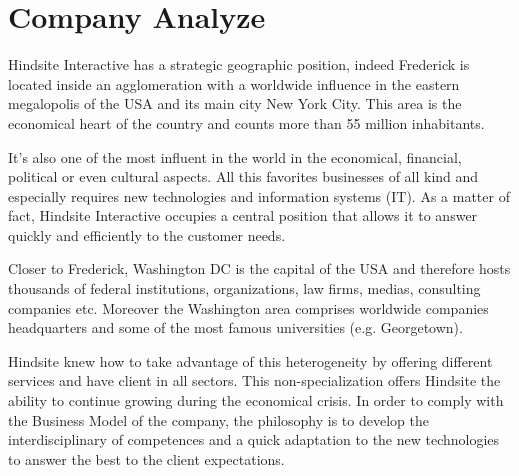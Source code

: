 \section{Company Analyze}

Hindsite Interactive has a strategic geographic position, indeed Frederick is
located inside an agglomeration with a worldwide influence in the eastern
megalopolis of the USA and its main city New York City. This area is the
economical heart of the country and counts more than 55 million inhabitants.

It’s also one of the most influent in the world in the economical, financial,
political or even cultural aspects. All this favorites businesses of all kind and
especially requires new technologies and information systems (IT). As a
matter of fact, Hindsite Interactive occupies a central position that allows it to
answer quickly and efficiently to the customer needs.

Closer to Frederick, Washington DC is the capital of the USA and therefore
hosts thousands of federal institutions, organizations, law firms, medias,
consulting companies etc. Moreover the Washington area comprises
worldwide companies headquarters and some of the most famous universities
(e.g. Georgetown).

Hindsite knew how to take advantage of this heterogeneity by offering different
services and have client in all sectors. This non-specialization offers Hindsite
the ability to continue growing during the economical crisis.
In order to comply with the Business Model of the company, the philosophy is
to develop the interdisciplinary of competences and a quick adaptation to the
new technologies to answer the best to the client expectations.

\clearpage